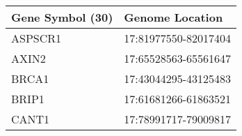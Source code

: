 \begin{tabular}{ll}
\toprule
Gene Symbol (30) &      Genome Location \\
\midrule
         ASPSCR1 & 17:81977550-82017404 \\
           AXIN2 & 17:65528563-65561647 \\
           BRCA1 & 17:43044295-43125483 \\
           BRIP1 & 17:61681266-61863521 \\
           CANT1 & 17:78991717-79009817 \\
\bottomrule
\end{tabular}
